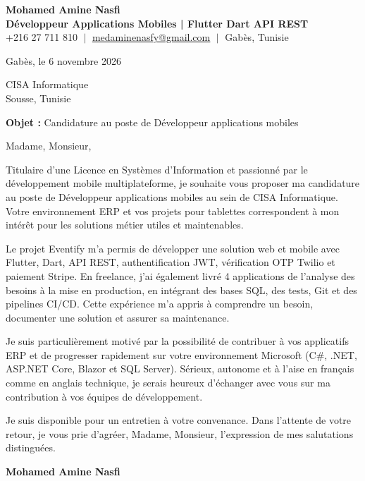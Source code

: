 \documentclass[11pt,a4paper]{article}
\begin{document}
\begin{center}
    \textbf{\Huge \color{navy} Mohamed Amine Nasfi} \\[3pt]
    \small \textbf{\color{accent} Développeur Applications Mobiles | Flutter \textperiodcentered{} Dart \textperiodcentered{} API REST} \\[3pt]
    \footnotesize \color{greytext}
    +216 27 711 810 $\;|\;$
    \href{mailto:medaminenasfy@gmail.com}{\underline{medaminenasfy@gmail.com}} $\;|\;$
    Gabès, Tunisie
\end{center}

\vspace{8pt}
\hfill Gabès, le 6 novembre 2026

\vspace{12pt}
CISA Informatique \\ Sousse, Tunisie

\vspace{10pt}
\textbf{Objet :} Candidature au poste de Développeur applications mobiles

\vspace{4pt}
Madame, Monsieur,

Titulaire d'une Licence en Systèmes d'Information et passionné par le développement mobile multiplateforme, je souhaite vous proposer ma candidature au poste de Développeur applications mobiles au sein de CISA Informatique. Votre environnement ERP et vos projets pour tablettes correspondent à mon intérêt pour les solutions métier utiles et maintenables.

Le projet Eventify m'a permis de développer une solution web et mobile avec Flutter, Dart, API REST, authentification JWT, vérification OTP Twilio et paiement Stripe. En freelance, j'ai également livré 4 applications de l'analyse des besoins à la mise en production, en intégrant des bases SQL, des tests, Git et des pipelines CI/CD. Cette expérience m'a appris à comprendre un besoin, documenter une solution et assurer sa maintenance.

Je suis particulièrement motivé par la possibilité de contribuer à vos applicatifs ERP et de progresser rapidement sur votre environnement Microsoft (C\#, .NET, ASP.NET Core, Blazor et SQL Server). Sérieux, autonome et à l'aise en français comme en anglais technique, je serais heureux d'échanger avec vous sur ma contribution à vos équipes de développement.

Je suis disponible pour un entretien à votre convenance. Dans l'attente de votre retour, je vous prie d'agréer, Madame, Monsieur, l'expression de mes salutations distinguées.



\vspace{14pt}
\hfill \textbf{Mohamed Amine Nasfi}
\end{document}
